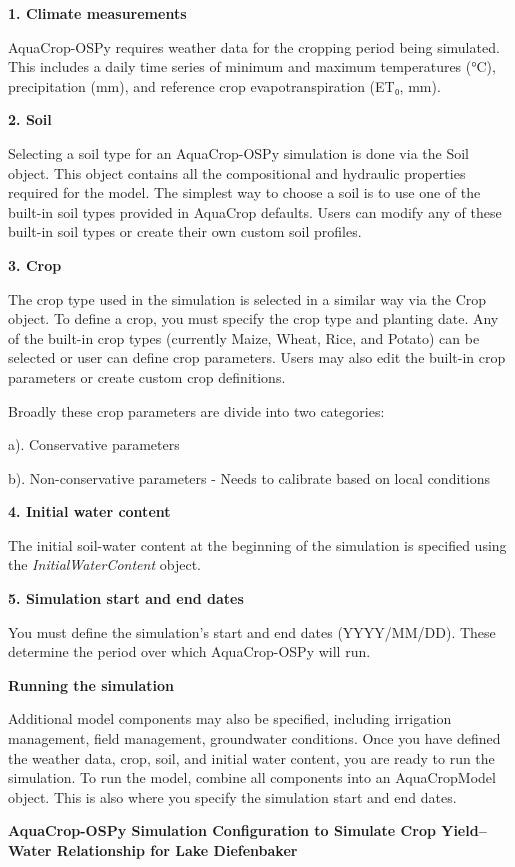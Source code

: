 \documentclass[
  letterpaper,
  DIV=11,
  numbers=noendperiod]{scrartcl}
\begin{document}
\textbf{1. Climate measurements}

AquaCrop-OSPy requires weather data for the cropping period being
simulated. This includes a daily time series of minimum and maximum
temperatures (°C), precipitation (mm), and reference crop
evapotranspiration (ET₀, mm).

\textbf{2. Soil}

Selecting a soil type for an AquaCrop-OSPy simulation is done via the
Soil object. This object contains all the compositional and hydraulic
properties required for the model. The simplest way to choose a soil is
to use one of the built-in soil types provided in AquaCrop defaults.
Users can modify any of these built-in soil types or create their own
custom soil profiles.

\textbf{3. Crop}

The crop type used in the simulation is selected in a similar way via
the Crop object. To define a crop, you must specify the crop type and
planting date. Any of the built-in crop types (currently Maize, Wheat,
Rice, and Potato) can be selected or user can define crop parameters.
Users may also edit the built-in crop parameters or create custom crop
definitions.

Broadly these crop parameters are divide into two categories:

a). Conservative parameters

b). Non-conservative parameters - Needs to calibrate based on local
conditions

\textbf{4. Initial water content}

The initial soil-water content at the beginning of the simulation is
specified using the \emph{InitialWaterContent} object.

\textbf{5. Simulation start and end dates}

You must define the simulation's start and end dates (YYYY/MM/DD). These
determine the period over which AquaCrop-OSPy will run.

\textbf{Running the simulation}

Additional model components may also be specified, including irrigation
management, field management, groundwater conditions. Once you have
defined the weather data, crop, soil, and initial water content, you are
ready to run the simulation. To run the model, combine all components
into an AquaCropModel object. This is also where you specify the
simulation start and end dates.

\textbf{AquaCrop-OSPy Simulation Configuration to Simulate Crop
Yield--Water Relationship for Lake Diefenbaker}
\end{document}
